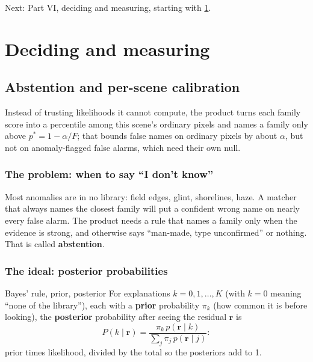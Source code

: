 \documentclass[11pt,a4paper,oneside,openany]{book}
\newcommand{\B}[1]{{\symbf{#1}}}
\newcommand{\B}[1]{{\bm{#1}}}
\newcommand{\vr}{\B{r}}
\newcommand{\nextchapter}[1]{\par\medskip\noindent\hfill\textsf{\small Next: #1}\par}
\begin{document}
\nextchapter{Part VI, deciding and measuring, starting with \cref{ch:abstain}.}
\part{Deciding and measuring}
\label{part:deciding}

\chapter{Abstention and per-scene calibration}
\label{ch:abstain}

\begin{onething}
Instead of trusting likelihoods it cannot compute, the product turns each family score into a percentile among this scene's ordinary pixels and names a family
only above $p^\ast=1-\alpha/F$; that bounds false names on ordinary pixels by about $\alpha$, but not on anomaly-flagged false alarms, which need their own null.
\end{onething}

\section{The problem: when to say ``I don't know''}

Most anomalies are in no library: field edges, glint, shorelines, haze. A matcher that always names the closest family will put a confident wrong name on
nearly every false alarm. The product needs a rule that names a family only when the evidence is strong, and otherwise says ``man-made, type
unconfirmed'' or nothing. That is called \textbf{abstention}.

\section{The ideal: posterior probabilities}

\begin{defn}{Bayes' rule, prior, posterior}
For explanations $k=0,1,\dots,K$ (with $k=0$ meaning ``none of the library''), each with a \textbf{prior} probability $\pi_k$ (how common it is before looking), the
\textbf{posterior} probability after seeing the residual $\vr$ is
\[
  P(k\mid\vr)=\frac{\pi_k\,p(\vr\mid k)}{\sum_j\pi_j\,p(\vr\mid j)} :
\]
prior times likelihood, divided by the total so the posteriors add to 1.
\end{defn}
\end{document}
